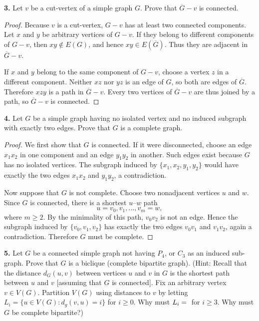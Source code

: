 \documentclass[12pt]{amsart}
\theoremstyle{conjecture}
\theoremstyle{definition}
\theoremstyle{question}
\theoremstyle{theorem}
\begin{document}
    \noindent\textbf{3.} Let $v$ be a cut-vertex of a simple graph $G$.
    Prove that $\overline{G} - v$ is connected.

    \begin{proof}
        Because $v$ is a cut-vertex, $G-v$ has at least two connected
        components.  Let $x$ and $y$ be arbitrary vertices of $G-v$.  If they
        belong to different components of $G-v$, then $xy\notin E(G)$, and
        hence $xy\in E(\overline{G})$.  Thus they are adjacent in
        $\overline{G}-v$.


        If $x$ and $y$ belong to the same component of $G-v$, choose a vertex
        $z$ in a different component.  Neither $xz$ nor $yz$ is an edge of
        $G$, so both are edges of $\overline{G}$.  Therefore $xzy$ is a path
        in $\overline{G}-v$.  Every two vertices of $\overline{G}-v$ are thus
        joined by a path, so $\overline{G}-v$ is connected.
    \end{proof}

    \noindent\textbf{4.} Let $G$ be a simple graph having no isolated vertex and no induced
    subgraph with exactly two edges.
    Prove that $G$ is a complete graph.

    \begin{proof}
        We first show that $G$ is connected.  If it were disconnected, choose
        an edge $x_1x_2$ in one component and an edge $y_1y_2$ in another.
        Such edges exist because $G$ has no isolated vertices.  The subgraph
        induced by $\{x_1,x_2,y_1,y_2\}$ would have exactly the two edges
        $x_1x_2$ and $y_1y_2$, a contradiction.

        Now suppose that $G$ is not complete.  Choose two nonadjacent vertices
        $u$ and $w$.  Since $G$ is connected, there is a shortest
        $u$--$w$ path
        \[
            u=v_0,v_1,\ldots,v_m=w,
        \]
        where $m\geq 2$.  By the minimality of this path, $v_0v_2$ is not an
        edge.  Hence the subgraph induced by $\{v_0,v_1,v_2\}$ has exactly the
        two edges $v_0v_1$ and $v_1v_2$, again a contradiction.  Therefore
        $G$ must be complete.
    \end{proof}

    \noindent\textbf{5.} Let $G$ be a connected simple graph not having $P_4$, or $C_3$ as
    an induced sub-graph.
    Prove that $G$ is a biclique (complete bipartite graph).
    (Hint: Recall that the distance $d_G(u,v)$ between vertices $u$ and $v$ in $G$ is the shortest
    path between $u$ and $v$ [assuming that $G$ is connected].
    Fix an arbitrary vertex $v\in V(G)$.
    Partition $V(G)$ using distances to $v$ by letting $L_i=\{u\in V(G): d_g(v,u) = i\}$
    for $i\ge 0$.
    Why must $L_i=\null$ for $i\ge 3$.
    Why must $G$ be complete bipartite?)
\end{document}
